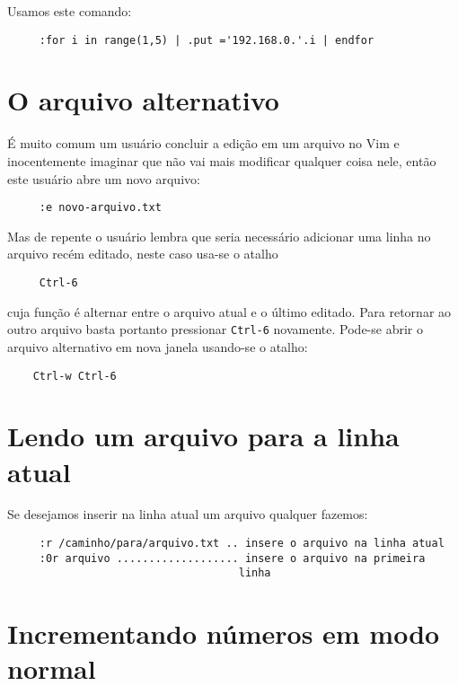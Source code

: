 Usamos este comando:

\begin{verbatim}
     :for i in range(1,5) | .put ='192.168.0.'.i | endfor
\end{verbatim}

\section{O arquivo alternativo}
\label{O arquivo alternativo}

É muito comum um usuário concluir a edição em um arquivo no Vim e
inocentemente imaginar que não vai mais modificar qualquer coisa nele, então
este usuário abre um novo arquivo:

\begin{verbatim}
     :e novo-arquivo.txt
\end{verbatim}

Mas de repente o usuário lembra que seria necessário adicionar uma linha no
arquivo recém editado, neste caso usa-se o atalho

\begin{verbatim}
     Ctrl-6
\end{verbatim}

cuja função é alternar entre o arquivo atual e o último editado. Para retornar
ao outro arquivo basta portanto pressionar \verb|Ctrl-6| novamente. Pode-se 
abrir o arquivo alternativo em nova janela usando-se o atalho:

\begin{verbatim}
    Ctrl-w Ctrl-6
\end{verbatim}

\section{Lendo um arquivo para a linha atual}
\label{sec:Lendo um arquivo para a linha atual}

Se desejamos inserir na linha atual um arquivo qualquer fazemos:

\begin{verbatim}
	 :r /caminho/para/arquivo.txt .. insere o arquivo na linha atual
	 :0r arquivo ................... insere o arquivo na primeira 
                                    linha
\end{verbatim}


\section{Incrementando números em modo normal}\label{Incrementando números em modo normal}

